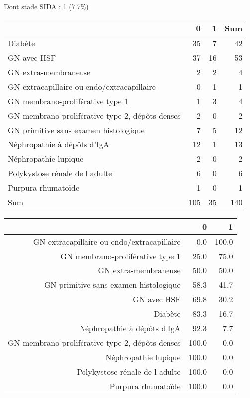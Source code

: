 \documentclass[11pt,a4paper]{article}\usepackage[]{graphicx}\usepackage[]{color}
\begin{document}
Dont stade SIDA : 1 (7.7\%)
\begin{table}[H]
\centering
\begin{tabular}{lrrr}
  \hline
 & 0 & 1 & Sum \\ 
  \hline
Diabète & 35 & 7 & 42 \\ 
  GN avec HSF & 37 & 16 & 53 \\ 
  GN extra-membraneuse & 2 & 2 & 4 \\ 
  GN extracapillaire ou endo/extracapillaire & 0 & 1 & 1 \\ 
  GN membrano-proliférative type 1 & 1 & 3 & 4 \\ 
  GN membrano-proliférative type 2, dépôts denses & 2 & 0 & 2 \\ 
  GN primitive sans examen histologique & 7 & 5 & 12 \\ 
  Néphropathie à dépôts d'IgA & 12 & 1 & 13 \\ 
  Néphropathie lupique & 2 & 0 & 2 \\ 
  Polykystose rénale de l adulte & 6 & 0 & 6 \\ 
  Purpura rhumatoïde & 1 & 0 & 1 \\ 
  Sum & 105 & 35 & 140 \\ 
   \hline
\end{tabular}
\end{table}
\begin{table}[H]
\centering
\begin{tabular}{rrr}
  \hline
 & 0 & 1 \\ 
  \hline
GN extracapillaire ou endo/extracapillaire & 0.0 & 100.0 \\ 
  GN membrano-proliférative type 1 & 25.0 & 75.0 \\ 
  GN extra-membraneuse & 50.0 & 50.0 \\ 
  GN primitive sans examen histologique & 58.3 & 41.7 \\ 
  GN avec HSF & 69.8 & 30.2 \\ 
  Diabète & 83.3 & 16.7 \\ 
  Néphropathie à dépôts d'IgA & 92.3 & 7.7 \\ 
  GN membrano-proliférative type 2, dépôts denses & 100.0 & 0.0 \\ 
  Néphropathie lupique & 100.0 & 0.0 \\ 
  Polykystose rénale de l adulte & 100.0 & 0.0 \\ 
  Purpura rhumatoïde & 100.0 & 0.0 \\ 
   \hline
\end{tabular}
\end{table}
\end{document}
